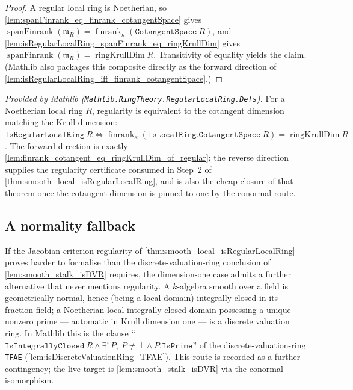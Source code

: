 \begin{proof}
        \leanok
  A regular local ring is Noetherian, so
  \cref{lem:spanFinrank_eq_finrank_cotangentSpace} gives
  \(\operatorname{spanFinrank}(\mathfrak m_R) = \operatorname{finrank}_\kappa
  (\texttt{CotangentSpace}\ R)\), and
  \cref{lem:isRegularLocalRing_spanFinrank_eq_ringKrullDim} gives
  \(\operatorname{spanFinrank}(\mathfrak m_R) = \operatorname{ringKrullDim}
  R\). Transitivity of equality yields the claim. (Mathlib also packages this
  composite directly as the forward direction of
  \cref{lem:isRegularLocalRing_iff_finrank_cotangentSpace}.)
\end{proof}

\begin{lemma}
  \label{lem:isRegularLocalRing_iff_finrank_cotangentSpace}
  \mathlibok
  \textit{Provided by Mathlib
  (\texttt{Mathlib.RingTheory.RegularLocalRing.Defs}).}
  For a Noetherian local ring \(R\), regularity is equivalent to the
  cotangent dimension matching the Krull dimension:
  \(\texttt{IsRegularLocalRing}\ R \iff \operatorname{finrank}_\kappa
  (\texttt{IsLocalRing.CotangentSpace}\ R) = \operatorname{ringKrullDim} R\).
  The forward direction is exactly
  \cref{lem:finrank_cotangent_eq_ringKrullDim_of_regular}; the reverse
  direction supplies the regularity certificate consumed in Step~2 of
  \cref{thm:smooth_local_isRegularLocalRing}, and is also the cheap closure of
  that theorem once the cotangent dimension is pinned to one by the conormal
  route.
\end{lemma}

\subsection*{A normality fallback}

If the Jacobian-criterion regularity of
\cref{thm:smooth_local_isRegularLocalRing} proves harder to formalise than
the discrete-valuation-ring conclusion of \cref{lem:smooth_stalk_isDVR}
requires, the dimension-one case admits a further alternative that never
mentions regularity. A \(k\)-algebra smooth over a field is geometrically
normal, hence (being a local domain) integrally closed in its fraction
field; a Noetherian local integrally closed domain possessing a unique
nonzero prime --- automatic in Krull dimension one --- is a discrete
valuation ring. In Mathlib this is the clause
``\(\texttt{IsIntegrallyClosed}\ R \wedge \exists!\, P,\ P \neq \bot \wedge
P.\texttt{IsPrime}\)'' of the discrete-valuation-ring \texttt{TFAE}
(\cref{lem:isDiscreteValuationRing_TFAE}). This route is recorded as a further
contingency; the live target is \cref{lem:smooth_stalk_isDVR} via the conormal
isomorphism.

